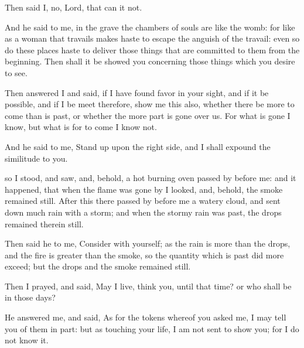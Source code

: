{\par }{\PP {}Then said I, no, Lord, that can it not.
\par }{\PP And he said to me, in the grave the chambers of souls are like the womb:
for like as a woman that travails makes haste to escape the anguish of the travail: even so do these places haste to deliver those things that are committed to them from the beginning.
Then shall it be showed you concerning those things which you desire to see.
\par }{\PP {}Then answered I and said, if I have found favor in your sight, and if it be possible, and if I be meet therefore,
show me this also, whether there be more to come than is past, or whether the more part is gone over us.
For what is gone I know, but what is for to come I know not.
\par }{\PP {}And he said to me, Stand up upon the right side, and I shall expound the similitude to you.
\par }{\PP {}so I stood, and saw, and, behold, a hot burning oven passed by before me: and it happened, that when the flame was gone by I looked, and, behold, the smoke remained still.
After this there passed by before me a watery cloud, and sent down much rain with a storm; and when the stormy rain was past, the drops remained therein still.
\par }{\PP {}Then said he to me, Consider with yourself; as the rain is more than the drops, and the fire is greater than the smoke, so the quantity which is past did more exceed; but the drops and the smoke remained still.
\par }{\PP {}Then I prayed, and said, May I live, think you, until that time? or who shall be in those days?
\par }{\PP {}He answered me, and said, As for the tokens whereof you asked me, I may tell you of them in part: but as touching your life, I am not sent to show you; for I do not know it.

}
